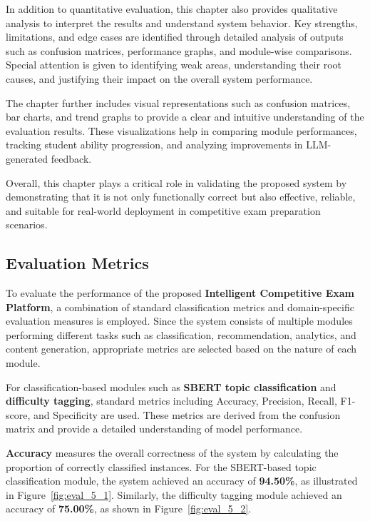 \begin{sloppypar}
In addition to quantitative evaluation, this chapter also provides qualitative analysis to interpret the results and understand system behavior. Key strengths, limitations, and edge cases are identified through detailed analysis of outputs such as confusion matrices, performance graphs, and module-wise comparisons. Special attention is given to identifying weak areas, understanding their root causes, and justifying their impact on the overall system performance.

The chapter further includes visual representations such as confusion matrices, bar charts, and trend graphs to provide a clear and intuitive understanding of the evaluation results. These visualizations help in comparing module performances, tracking student ability progression, and analyzing improvements in LLM-generated feedback.

Overall, this chapter plays a critical role in validating the proposed system by demonstrating that it is not only functionally correct but also effective, reliable, and suitable for real-world deployment in competitive exam preparation scenarios.

\subsection{Evaluation Metrics}

To evaluate the performance of the proposed \textbf{Intelligent Competitive Exam Platform}, a combination of standard classification metrics and domain-specific evaluation measures is employed. Since the system consists of multiple modules performing different tasks such as classification, recommendation, analytics, and content generation, appropriate metrics are selected based on the nature of each module.

For classification-based modules such as \textbf{SBERT topic classification} and \textbf{difficulty tagging}, standard metrics including Accuracy, Precision, Recall, F1-score, and Specificity are used. These metrics are derived from the confusion matrix and provide a detailed understanding of model performance.

\textbf{Accuracy} measures the overall correctness of the system by calculating the proportion of correctly classified instances. For the SBERT-based topic classification module, the system achieved an accuracy of \textbf{94.50\%}, as illustrated in Figure~\ref{fig:eval_5_1}. Similarly, the difficulty tagging module achieved an accuracy of \textbf{75.00\%}, as shown in Figure~\ref{fig:eval_5_2}.


\end{sloppypar}
